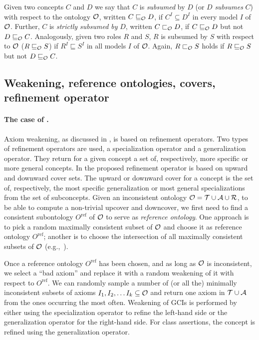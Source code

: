 \documentclass[
]{ceurart}
\begin{document}
Given two concepts $C$ and $D$ we say that $C$ is \emph{subsumed} by $D$ (or $D$ \emph{subsumes} $C$) with respect to the ontology $\mathcal{O}$, written $C \sqsubseteq_\mathcal{O} D$, if $C^I \subseteq D^I$ in every model $I$ of $\mathcal{O}$. Further, $C$ is \emph{strictly subsumed by} $D$, written $C \sqsubset_\mathcal{O} D$, if $C \sqsubseteq_\mathcal{O} D$ but not $D \sqsubseteq_\mathcal{O} C$. Analogously, given two roles $R$ and $S$, $R$ is subsumed by $S$ with respect to $\mathcal{O}$ ($R \sqsubseteq_\mathcal{O} S$) if $R^I \sqsubseteq S^I$ in all models $I$ of $\mathcal{O}$. Again, $R \sqsubset_\mathcal{O} S$ holds if $R \sqsubseteq_\mathcal{O} S$ but not $D \sqsubseteq_\mathcal{O} C$.

\subsection{Weakening, reference ontologies, covers, refinement operator}

\paragraph{The case of \ALC.}
Axiom weakening, as discussed in \cite{troquard2018repairing}, is based on refinement operators. Two types of refinement operators are used, a specialization operator and a generalization operator. They return for a given concept a set of, respectively, more specific or more general concepts. In \cite{troquard2018repairing} the proposed refinement operator is based on upward and downward cover sets. The upward or downward cover for a concept is the set of, respectively, the most specific generalization or most general specializations from the set of subconcepts.
%
Given an inconsistent ontology $\mathcal{O} = \mathcal{T} \cup \mathcal{A} \cup \mathcal{R}$, to be able to compute a non-trivial upcover and downcover, we first need to find a consistent subontology $O^\text{ref}$ of $\mathcal{O}$ to serve as \emph{reference ontology}. One approach is to pick a random maximally consistent subset of $\mathcal{O}$ and choose it as reference ontology $O^\text{ref}$; another is to choose the intersection of all maximally consistent subsets of $\mathcal{O}$ (e.g.,~\cite{LLRRS10}).

Once a reference ontology $O^\text{ref}$ has been chosen, and as long as $\mathcal{O}$ is inconsistent, we select a ``bad axiom'' and replace it with a random weakening of it with respect to $O^\text{ref}$.
%
We can randomly sample a number of (or all the) minimally inconsistent subsets of axioms $I_1, I_2, \ldots I_k \subseteq \mathcal{O}$ and return one axiom in $\mathcal{T} \cup \mathcal{A}$ from the ones occurring the most often.
%
Weakening of GCIs is performed by either using the specialization operator to refine the left-hand side or the generalization operator for the right-hand side. For class assertions, the concept is refined using the generalization operator.
\end{document}
